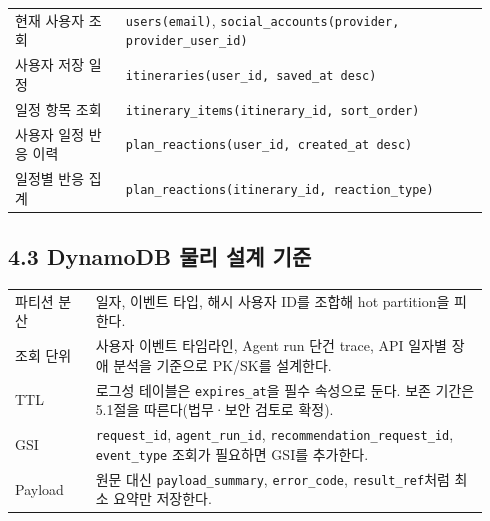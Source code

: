 \documentclass[12pt,a4paper]{article}
\newcommand{\DocNeedspace}[1]{\par\ifdim\dimexpr\pagegoal-\pagetotal\relax<#1\newpage\fi}
\begin{document}
\DocNeedspace{16\baselineskip}
\begin{small}
\begin{longtable}{@{}>{\centering\arraybackslash}m{0.220\linewidth}>{\RaggedRight\arraybackslash}m{0.720\linewidth}@{}}
\toprule
\multicolumn{1}{>{\centering\arraybackslash}m{0.220\linewidth}}{\textbf{조회 패턴}} & \multicolumn{1}{>{\centering\arraybackslash}m{0.720\linewidth}}{\textbf{인덱스 후보}} \\
\midrule
\endhead
현재 사용자 조회 & \texttt{users(email)}, \texttt{social\_\allowbreak{}accounts(provider, provider\_\allowbreak{}user\_\allowbreak{}id)} \\
사용자 저장 일정 & \texttt{itineraries(user\_\allowbreak{}id, saved\_\allowbreak{}at desc)} \\
일정 항목 조회 & \texttt{itinerary\_\allowbreak{}items(itinerary\_\allowbreak{}id, sort\_\allowbreak{}order)} \\
사용자 일정 반응 이력 & \texttt{plan\_\allowbreak{}reactions(user\_\allowbreak{}id, created\_\allowbreak{}at desc)} \\
일정별 반응 집계 & \texttt{plan\_\allowbreak{}reactions(itinerary\_\allowbreak{}id, reaction\_\allowbreak{}type)} \\
\bottomrule
\end{longtable}
\end{small}


\newpage
\DocNeedspace{24\baselineskip}
\subsection*{4.3 DynamoDB 물리 설계 기준}


\DocNeedspace{16\baselineskip}
\begin{small}
\begin{longtable}{@{}>{\centering\arraybackslash}m{0.160\linewidth}>{\RaggedRight\arraybackslash}m{0.780\linewidth}@{}}
\toprule
\multicolumn{1}{>{\centering\arraybackslash}m{0.160\linewidth}}{\textbf{기준}} & \multicolumn{1}{>{\centering\arraybackslash}m{0.780\linewidth}}{\textbf{결정}} \\
\midrule
\endhead
파티션 분산 & 일자, 이벤트 타입, 해시 사용자 ID를 조합해 hot partition을 피한다. \\
조회 단위 & 사용자 이벤트 타임라인, Agent run 단건 trace, API 일자별 장애 분석을 기준으로 PK/SK를 설계한다. \\
TTL & 로그성 테이블은 \texttt{expires\_\allowbreak{}at}을 필수 속성으로 둔다. 보존 기간은 5.1절을 따른다(법무·보안 검토로 확정). \\
GSI & \texttt{request\_\allowbreak{}id}, \texttt{agent\_\allowbreak{}run\_\allowbreak{}id}, \texttt{recommendation\_\allowbreak{}request\_\allowbreak{}id}, \texttt{event\_\allowbreak{}type} 조회가 필요하면 GSI를 추가한다. \\
Payload & 원문 대신 \texttt{payload\_\allowbreak{}summary}, \texttt{error\_\allowbreak{}code}, \texttt{result\_\allowbreak{}ref}처럼 최소 요약만 저장한다. \\
\bottomrule
\end{longtable}
\end{small}
\end{document}
